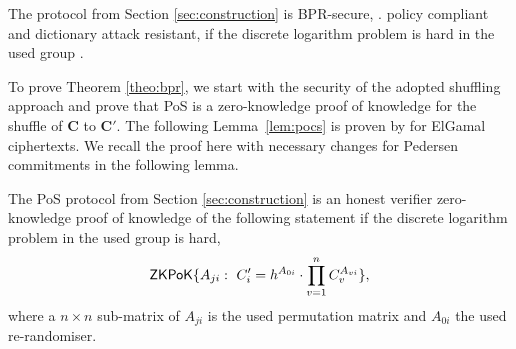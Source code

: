 \begin{theorem}\label{theo:bpr}
  The protocol from Section \ref{sec:construction} is \ac{BPR}-secure, \ie. policy compliant and dictionary attack resistant, if the discrete logarithm problem is hard in the used group \GG.
\end{theorem}

\noindent
To prove Theorem \ref{theo:bpr}, we start with the security of the adopted shuffling approach and prove that \ac{PoS} is a zero-knowledge proof of knowledge for the shuffle of $\bm C$ to $\bm C'$.
The following Lemma~\ref{lem:pocs} is proven by \citet{Furukawa05} for ElGamal ciphertexts.
We recall the proof here with necessary changes for Pedersen commitments in the following lemma.

\begin{lemma} \label{lem:pocs}
  The \ac{PoS} protocol from Section \ref{sec:construction} is an honest verifier zero-knowledge proof of knowledge of the following statement if the discrete logarithm problem in the used group is hard,
  \[\mathsf{ZKPoK}\{A_{ji}:~ C'_i=h^{A_{0i}}\cdot\prod_{v=1}^n C_v^{A_{vi}}\},\]
  where a $n\times n$ sub-matrix of $A_{ji}$ is the used permutation matrix and $A_{0i}$ the used re-randomiser.
\end{lemma}

